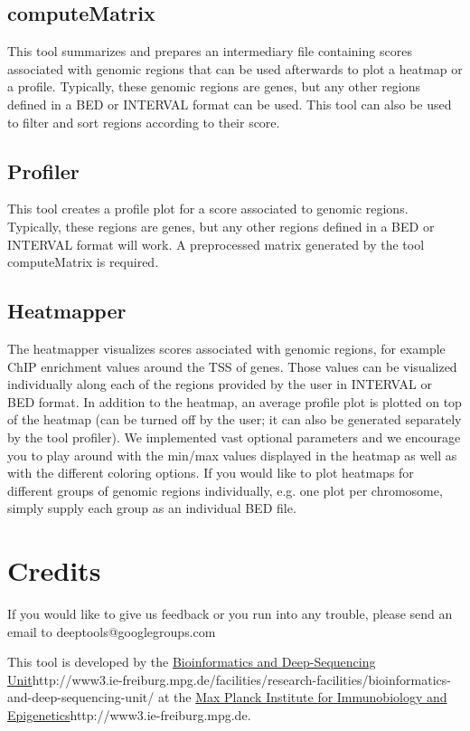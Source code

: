 \documentclass[11pt,a4paper]{article}
\begin{document}
\subsection{computeMatrix}

This tool summarizes and prepares an intermediary file containing
scores associated with genomic regions that can be used afterwards to
plot a heatmap or a profile. Typically, these genomic regions are
genes, but any other regions defined in a BED or INTERVAL format can
be used. This tool can also be used to filter and sort regions
according to their score.


\subsection{Profiler}

This tool creates a profile plot for a score associated to genomic regions.
Typically, these regions are genes, but any other regions defined in a BED or
INTERVAL format will work. A preprocessed matrix generated by the tool
computeMatrix is required.


\subsection{Heatmapper}

The heatmapper visualizes scores associated with genomic regions, for
example ChIP enrichment values around the TSS of genes. Those values
can be visualized individually along each of the regions provided by
the user in INTERVAL or BED format. In addition to the heatmap, an
average profile plot is plotted on top of the heatmap (can be turned
off by the user; it can also be generated separately by the tool
profiler). We implemented vast optional parameters and we encourage
you to play around with the min/max values displayed in the heatmap as
well as with the different coloring options. If you would like to plot
heatmaps for different groups of genomic regions individually,
e.g. one plot per chromosome, simply supply each group as an
individual BED file.





\section{Credits}


If you would like to give us feedback or you run into any trouble,
please send an email to deeptools@googlegroups.com

This tool is developed by the 
\url{Bioinformatics and Deep-Sequencing Unit}{http://www3.ie-freiburg.mpg.de/facilities/research-facilities/bioinformatics-and-deep-sequencing-unit/}
at the 
\url{Max Planck Institute for Immunobiology and Epigenetics}{http://www3.ie-freiburg.mpg.de}.
\end{document}
